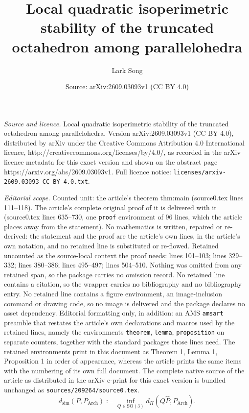 \documentclass[10pt,a4paper]{amsart}
\title{Local quadratic isoperimetric stability of the truncated octahedron among parallelohedra}
\author{Lark Song}
\date{Source: arXiv:2609.03093v1 (CC BY 4.0)}
\newcommand{\Arch}{P_{\mathrm{Arch}}}
\begin{document}
\maketitle

\noindent\emph{Source and licence.} Local quadratic isoperimetric stability of the truncated octahedron among parallelohedra. Version arXiv:2609.03093v1 (CC BY 4.0), distributed by arXiv under the Creative Commons Attribution 4.0 International licence, http://creativecommons.org/licenses/by/4.0/, as recorded in the arXiv licence metadata for this exact version and shown on the abstract page https://arxiv.org/abs/2609.03093v1. Full licence notice: \texttt{licenses/arxiv-2609.03093-CC-BY-4.0.txt}.\par\smallskip

\noindent\textit{Editorial scope.} Counted unit: the article's theorem thm:main (source0.tex lines 111--118). The article's complete original proof of it is delivered with it (source0.tex lines 635--730, one \texttt{proof} environment of 96 lines, which the article places away from the statement). No mathematics is written, repaired or re-derived: the statement and the proof are the article's own lines, in the article's own notation, and no retained line is substituted or re-flowed.  Retained uncounted as the source-local context the proof needs: lines 101--103; lines 329--332; lines 380--386; lines 495--497; lines 504--510.  Nothing was omitted from any retained span, so the package carries no omission record.  No retained line contains a citation, so the wrapper carries no bibliography and no bibliography entry.  No retained line contains a figure environment, an image-inclusion command or drawing code, so no image is delivered and the package declares no asset dependency.  Editorial formatting only, in addition: an AMS \texttt{amsart} preamble that restates the article's own declarations and macros used by the retained lines, namely the environments \texttt{theorem}, \texttt{lemma}, \texttt{proposition} on separate counters, together with the standard packages those lines need.  The retained environments print in this document as Theorem 1, Lemma 1, Proposition 1 in order of appearance, whereas the article prints the same items with the numbering of its own full document.  The complete native source of the article as distributed in the arXiv e-print for this exact version is bundled unchanged as \texttt{sources/209264/source0.tex}.
\begin{equation}\label{eq:distance}
 d_{\mathrm{sim}}(P,\Arch):= \inf_{Q\in\mathrm{SO}(3)}d_H(Q\widehat P,\Arch).
\end{equation}
\end{document}
